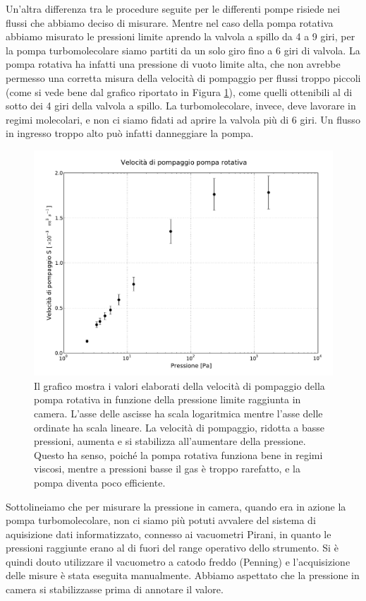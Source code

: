 Un'altra differenza tra le procedure seguite per le differenti pompe risiede nei flussi che abbiamo deciso di misurare.
Mentre nel caso della pompa rotativa abbiamo misurato le pressioni limite aprendo la valvola a spillo da 4 a 9 giri,
per la pompa turbomolecolare siamo partiti da un solo giro fino a 6 giri di valvola.
La pompa rotativa ha infatti una pressione di vuoto limite alta, che non avrebbe permesso
una corretta misura della velocità di pompaggio per flussi troppo piccoli (come si vede bene dal grafico
riportato in Figura \ref{fig:rotativa}), come quelli ottenibili al di sotto dei 4 giri della valvola a spillo.
La turbomolecolare, invece, deve lavorare in regimi molecolari, e non ci siamo fidati ad aprire la valvola più di 6 giri.
Un flusso in ingresso troppo alto può infatti danneggiare la pompa. 

\begin{figure}[b!]
	\centering
		\includegraphics[width = 145mm]{rotativa.pdf}
	\caption{Il grafico mostra i valori elaborati della velocità di pompaggio della pompa rotativa in funzione della pressione limite raggiunta in camera. L'asse delle ascisse ha scala logaritmica mentre l'asse delle ordinate ha scala lineare. La velocità di pompaggio, ridotta a basse pressioni, aumenta e si stabilizza all'aumentare della pressione. Questo ha senso, poiché la pompa rotativa funziona bene in regimi viscosi, mentre a pressioni basse il gas è troppo rarefatto, e la pompa diventa poco efficiente.}
		\label{fig:rotativa}
\end{figure}

Sottolineiamo che per misurare la pressione in camera, quando era in azione la pompa turbomolecolare,
non ci siamo più potuti avvalere del sistema di aquisizione dati informatizzato, connesso ai vacuometri Pirani,
in quanto le pressioni raggiunte erano al di fuori del range operativo dello strumento. Si è quindi douto utilizzare
il vacuometro a catodo freddo (Penning) e l'acquisizione delle misure è stata eseguita manualmente. Abbiamo aspettato che la
pressione in camera si stabilizzasse prima di annotare il valore.

